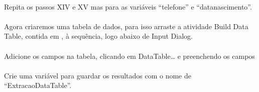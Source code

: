 \documentclass[letterpaper,10pt,brazil]{sphinxmanual}
\begin{document}
\begin{figure}[htbp]
\centering

\noindent{}
\end{figure}


\paragraph{}
\label{\detokenize{exercise_2:xvi-repertir-passos-xiv-e-xv}}
Repita os passos XIV e XV mas para as variáveis “telefone” e “datanascimento”.


\paragraph{}
\label{\detokenize{exercise_2:xvii-criar-datatable}}
Agora criaremos uma tabela de dados, para isso arraste a atividade Build Data Table, contida em , à sequência, logo abaixo de Input Dialog.

\begin{figure}[htbp]
\centering

\noindent{}
\end{figure}


\paragraph{}
\label{\detokenize{exercise_2:xviii-preencher-campos-datatable}}
Adicione os campos na tabela, clicando em DataTable… e preenchendo os campos

\begin{figure}[htbp]
\centering

\noindent{}
\end{figure}


\paragraph{}
\label{\detokenize{exercise_2:xix-criar-variavel-que-ira-conter-datatable}}
Crie uma variável para guardar os resultados com o nome de “ExtracaoDataTable”.
\end{document}
